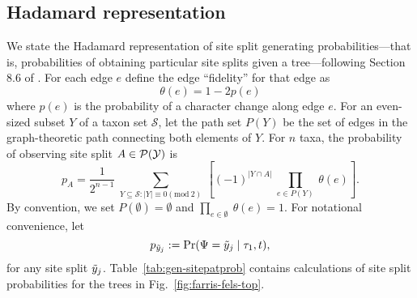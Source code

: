 \subsection*{Hadamard representation}

We state the Hadamard representation of site split generating probabilities---that is, probabilities of obtaining particular site splits given a tree---following Section 8.6 of \citet{Semple2003-em}.
For each edge $e$ define the edge ``fidelity'' for that edge as
\[
\theta(e) = 1-2p(e)
\]
where $p(e)$ is the probability of a character change along edge $e$.
For an even-sized subset $Y$ of a taxon set $\mathcal{S}$, let the path set $P(Y)$ be the set of edges in the graph-theoretic path connecting both elements of $Y$.
For $n$ taxa, the probability of observing site split $A\in\mathcal{P}(\mathcal{Y})$ is
\begin{equation}
\label{eq:hadamard_probability}
p_A = \frac{1}{2^{n-1}} \ \sum_{Y \subseteq \mathcal{S} : |Y| \equiv 0 (\mathrm{mod} \ 2)} \ \left[(-1)^{|Y \cap A|} \ \prod_{e\in P(Y)} \ \theta(e) \right].
\end{equation}
By convention, we set $P(\emptyset)=\emptyset$ and $\prod_{e\in\emptyset} \ \theta(e) = 1$.
For notational convenience, let
\[
p_{\tilde{y}_j} := \Pr(\Psi=\tilde{y}_j \mid \tau_1,t),
\]
for any site split $\tilde{y}_j$.
Table~\ref{tab:gen-sitepatprob} contains calculations of site split probabilities for the trees in Fig.~\ref{fig:farris-fels-top}.

